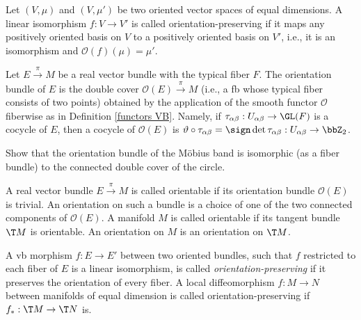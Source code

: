 \begin{defn}
    Let $(V,\mu)$ and $(V,\mu')$ be two oriented vector spaces of equal dimensions. A linear isomorphism $f:V\to V'$ is called orientation-preserving if it maps any positively oriented basis on $V$ to a positively oriented basis on $V'$, i.e., it is an isomorphism and $\mathcal{O}(f)(\mu)=\mu'$.
\end{defn}


\begin{defn}\label{def orientation bundle}
    Let $E\overset\pi\to M$ be a real vector bundle with the typical fiber $F$. The orientation bundle of $E$ is the double cover $\mathcal{O}(E)\overset{\pi}\to M$ (i.e., a \gls{fb} whose typical fiber consists of two points) obtained by the application of the smooth functor $\mathcal{O}$ fiberwise as in Definition \ref{functors VB}. Namely, if $\tau_{\alpha\beta}:U_{\alpha\beta}\to\GL(F)$ is a cocycle of $E$, then a cocycle of $\mathcal{O}(E)$ is $\vartheta\circ\tau_{\alpha\beta}=\sign\det\tau_{\alpha\beta}:U_{\alpha\beta}\to\bbZ_2$.
\end{defn}

\begin{xca}
    Show that the orientation bundle of the M\"obius band is isomorphic (as a fiber bundle) to the connected double cover of the circle.
\end{xca}

\begin{defn}
    A real vector bundle $E\overset\pi\to M$ is called orientable if its orientation bundle $\mathcal{O}(E)$ is trivial. An orientation on such a bundle is a choice of one of the two connected components of $\mathcal{O}(E)$. A manifold $M$ is called orientable if its tangent bundle $\T M$ is orientable. An orientation on $M$ is an orientation on $\T M$.

    A \gls{vb} morphism $f:E\to E'$ between two oriented bundles, such that $f$ restricted to each fiber of $E$ is a linear isomorphism, is called \emph{orientation-preserving} if it preserves the orientation of every fiber. A local diffeomorphism $f:M\to N$ between manifolds of equal dimension is called orientation-preserving if $f_\ast:\T M\to \T N$ is.
\end{defn}

